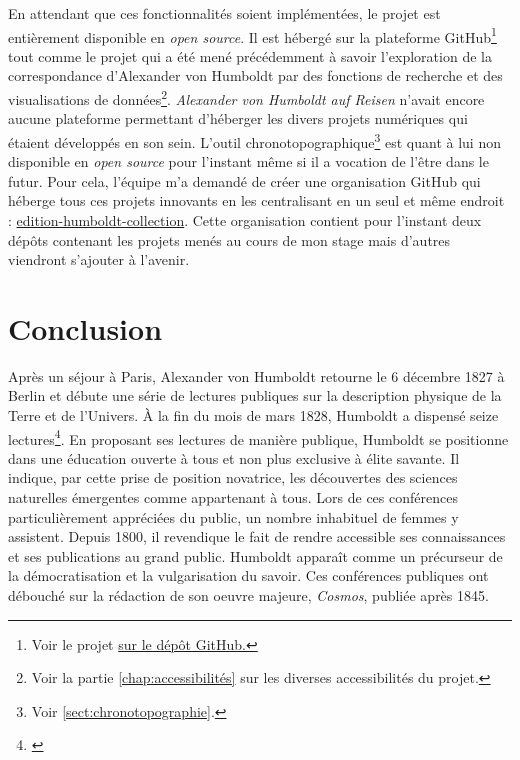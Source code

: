 \documentclass[a4paper, 12pt, twoside]{book}
\begin{document}
En attendant que ces fonctionnalités soient implémentées, le projet est entièrement disponible en \textit{open source}. Il est hébergé sur la plateforme GitHub\footnote{Voir le projet \href{https://github.com/edition-humboldt-collection/cS-matchingtool}{sur le dépôt GitHub.}} tout comme le projet qui a été mené précédemment à savoir l'exploration de la correspondance d'Alexander von Humboldt par des fonctions de recherche et des visualisations de données\footnote{Voir la partie \autoref{chap:accessibilités} sur les diverses accessibilités du projet.}.  \textit{Alexander von Humboldt auf Reisen} n'avait encore aucune plateforme permettant d'héberger les divers projets numériques qui étaient développés en son sein. L'outil chronotopographique\footnote{Voir \autoref{sect:chronotopographie}.} est quant à lui non disponible en \textit{open source} pour l'instant même si il a vocation de l'être dans le futur. Pour cela, l'équipe m'a demandé de créer une organisation GitHub qui héberge tous ces projets innovants en les centralisant en un seul et même endroit : \href{https://github.com/edition-humboldt-collection}{edition-humboldt-collection}. Cette organisation contient pour l'instant deux dépôts contenant les projets menés au cours de mon stage mais d'autres viendront s'ajouter à l'avenir. 


\chapter*{Conclusion}

Après un séjour à Paris, Alexander von Humboldt retourne le 6 décembre 1827 à Berlin et débute une série de lectures publiques sur la description physique de la Terre et de l'Univers. À la fin du mois de mars 1828, Humboldt a dispensé seize lectures\footnote{\cite{spies_resonance_2020}}. En proposant ses lectures de manière publique, Humboldt se positionne dans une éducation ouverte à tous et non plus exclusive à élite savante. Il indique, par cette prise de position novatrice, les découvertes des sciences naturelles émergentes comme appartenant à tous. Lors de ces conférences particulièrement appréciées du public, un nombre inhabituel de femmes y assistent. Depuis 1800, il revendique le fait de rendre accessible ses connaissances et ses publications au grand public. Humboldt apparaît comme un précurseur de la démocratisation et la vulgarisation du savoir. Ces conférences publiques ont débouché sur la rédaction de son oeuvre majeure, \textit{Cosmos}, publiée après 1845.
\end{document}
